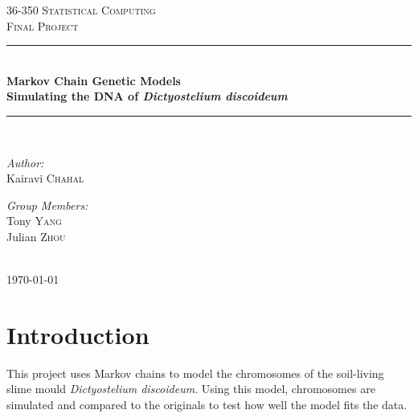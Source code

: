 \documentclass[12pt]{article}
\newcommand{\HRule}{\rule{\linewidth}{0.5mm}}
\begin{document}
\begin{titlepage}
\begin{center}
\vspace*{\fill}
\textsc{\Large 36-350 Statistical Computing}\\[8pt]
\textsc{\Large Final Project}\\[0.5cm]

\HRule \\[0.4cm]
{\LARGE \bfseries Markov Chain Genetic Models \\[0.4cm]}
{\normalsize \bfseries Simulating the DNA of \textit{Dictyostelium discoideum}\\[0.4cm]}
\HRule \\[1.5cm]

\begin{minipage}{0.4\textwidth}
\begin{flushleft} \normalsize
\emph{Author:}\\
Kairavi \textsc{Chahal}
\end{flushleft}
\end{minipage}
\begin{minipage}{0.4\textwidth}
\begin{flushright} \normalsize
\emph{Group Members:} \\
Tony \textsc{Yang}\\
Julian \textsc{Zhou}
\end{flushright}
\end{minipage}
\\[4cm]
{\normalsize \today}
\vspace*{\fill}
\end{center}
\end{titlepage}
\onehalfspacing
\section{Introduction}
This project uses Markov chains to model the chromosomes of the soil-living slime mould \textit{Dictyostelium discoideum}. Using this model, chromosomes are simulated and compared to the originals to test how well the model fits the data.
\end{document}
